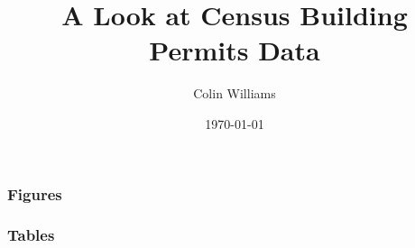 \documentclass[11pt,xcolor={dvipsnames},hyperref={pdftex,pdfpagemode=UseNone,hidelinks,pdfdisplaydoctitle=true},usepdftitle=false,aspectratio=169]{beamer}
\begin{document}
\title{A Look at Census Building Permits Data}
\subtitle{}
\author{Colin Williams}
\date{\today}

\begin{frame}
    \titlepage
\end{frame}


\begin{frame}
    \frametitle{Figures}
\end{frame}

\begin{frame}
    \frametitle{Tables}
\end{frame}
\end{document}
